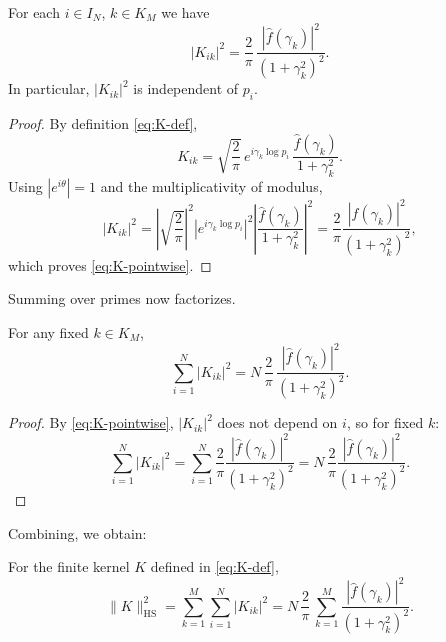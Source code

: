 \documentclass[11pt]{article}
\begin{document}
\begin{lemma}
For each $i\in I_N$, $k\in K_M$ we have
\begin{equation}
  |K_{ik}|^2
    = \frac{2}{\pi}\,
      \frac{|\widehat{f}(\gamma_k)|^2}{(1+\gamma_k^2)^2}.
  \label{eq:K-pointwise}
\end{equation}
In particular, $|K_{ik}|^2$ is independent of $p_i$.
\end{lemma}

\begin{proof}
By definition \eqref{eq:K-def},
\[
K_{ik} = \sqrt{\frac{2}{\pi}}\,e^{i\gamma_k \log p_i}
\,\frac{\widehat{f}(\gamma_k)}{1+\gamma_k^2}.
\]
Using $|e^{i\theta}|=1$ and the multiplicativity of modulus,
\[
|K_{ik}|^2
  = \left|\sqrt{\frac{2}{\pi}}\right|^2
    \left|e^{i\gamma_k\log p_i}\right|^2
    \left|\frac{\widehat{f}(\gamma_k)}{1+\gamma_k^2}\right|^2
  = \frac{2}{\pi}
    \frac{|\widehat{f}(\gamma_k)|^2}{(1+\gamma_k^2)^2},
\]
which proves \eqref{eq:K-pointwise}.
\end{proof}

Summing over primes now factorizes.

\begin{lemma}
For any fixed $k\in K_M$,
\begin{equation}
  \sum_{i=1}^N |K_{ik}|^2
    = N\,\frac{2}{\pi}\,
       \frac{|\widehat{f}(\gamma_k)|^2}{(1+\gamma_k^2)^2}.
  \label{eq:prime-sum}
\end{equation}
\end{lemma}

\begin{proof}
By \eqref{eq:K-pointwise}, $|K_{ik}|^2$ does not depend on $i$,
so for fixed $k$:
\[
\sum_{i=1}^N |K_{ik}|^2
  = \sum_{i=1}^N \frac{2}{\pi}
      \frac{|\widehat{f}(\gamma_k)|^2}{(1+\gamma_k^2)^2}
  = N\,\frac{2}{\pi}
      \frac{|\widehat{f}(\gamma_k)|^2}{(1+\gamma_k^2)^2}.
\]
\end{proof}

Combining, we obtain:

\begin{proposition}
For the finite kernel $K$ defined in \eqref{eq:K-def},
\begin{equation}
  \|K\|_{\mathrm{HS}}^2
    = \sum_{k=1}^M\sum_{i=1}^N |K_{ik}|^2
    = N\,\frac{2}{\pi}\,
      \sum_{k=1}^M
        \frac{|\widehat{f}(\gamma_k)|^2}{(1+\gamma_k^2)^2}.
  \label{eq:HS-zero-sum}
\end{equation}
\end{proposition}
\end{document}
